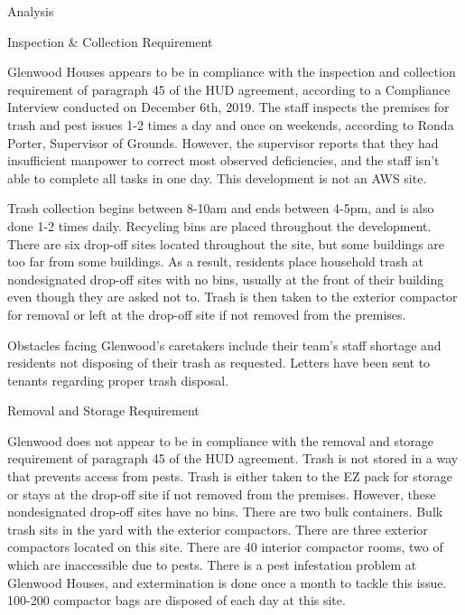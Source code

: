 Analysis

Inspection \& Collection Requirement

Glenwood Houses appears to be in compliance with the inspection and collection requirement of paragraph 45 of the HUD agreement, according to a Compliance Interview conducted on December 6th, 2019. The staff inspects the premises for trash and pest issues 1-2 times a day and once on weekends, according to Ronda Porter, Supervisor of Grounds. However, the supervisor reports that they had insufficient manpower to correct most observed deficiencies, and the staff isn't able to complete all tasks in one day. This development is not an AWS site.

Trash collection begins between 8-10am and ends between 4-5pm, and is also done 1-2 times daily. Recycling bins are placed throughout the development. There are six drop-off sites located throughout the site, but some buildings are too far from some buildings. As a result, residents place household trash at nondesignated drop-off sites with no bins, usually at the front of their building even though they are asked not to. Trash is then taken to the exterior compactor for removal or left at the drop-off site if not removed from the premises. 

Obstacles facing Glenwood's caretakers include their team's staff shortage and residents not disposing of their trash as requested. Letters have been sent to tenants regarding proper trash disposal.

Removal and Storage Requirement

Glenwood does not appear to be in compliance with the removal and storage requirement of paragraph 45 of the HUD agreement. Trash is not stored in a way that prevents access from pests. Trash is either taken to the EZ pack for storage or stays at the drop-off site if not removed from the premises. However, these nondesignated drop-off sites have no bins. There are two bulk containers. Bulk trash sits in the yard with the exterior compactors. There are three exterior compactors located on this site. There are 40 interior compactor rooms, two of which are inaccessible due to pests. There is a pest infestation problem at Glenwood Houses, and extermination is done once a month to tackle this issue. 100-200 compactor bags are disposed of each day at this site. 